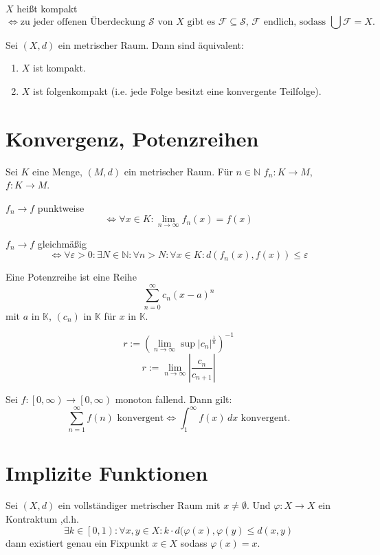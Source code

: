 \documentclass[]{scrartcl}
\newcommand{\N}{\ensuremath{\mathbb{N}}}
\begin{document}
\begin{definition}[Kompaktheit]
$X$ hei\ss t kompakt
\[\Leftrightarrow\text{zu jeder offenen \"Uberdeckung $\mathcal{S}$ von $X$ gibt es $\mathcal{F}\subseteq\mathcal{S}$, $\mathcal{F}$ endlich, sodass $\bigcup\mathcal{F}=X$.}\]
\end{definition}

\begin{satz}
Sei $(X,d)$ ein metrischer Raum. Dann sind \"aquivalent:
\begin{enumerate}
\item $X$ ist kompakt.
\item $X$ ist folgenkompakt (i.e. jede Folge besitzt eine konvergente Teilfolge). 
\end{enumerate}
\end{satz}

\section*{Konvergenz, Potenzreihen}
\begin{definition}[konvergenz]
Sei $K$ eine Menge, $(M,d)$ ein metrischer Raum. F\"ur $n\in\N$ $f_n\colon K\to M$, $f\colon K\to M$.

$f_n\to f$ punktweise
\[\Leftrightarrow \forall x\in K \colon  \lim\limits_{n\to\infty}f_n(x)=f(x)\]

$f_n\to f$ gleichm\"a\ss ig
\[\Leftrightarrow \forall \varepsilon>0 \colon  \exists N\in\N\colon \forall n>N \colon  \forall x\in K\colon  d(f_n(x),f(x))\leq\varepsilon\]
\end{definition}

\begin{definition}[Potenzreihe]
Eine Potenzreihe ist eine Reihe
\[\sum\limits^\infty_{n=0}c_n(x-a)^n\]
mit $a$ in $\mathbb{K}$, $(c_n)$ in $\mathbb{K}$ f\"ur $x$ in $\mathbb{K}$.
\end{definition}

\begin{satz}[Konvergenzradius]
\[r:=(\lim_{n\to\infty}\sup{|c_n|^{\frac{1}{n}}})^{-1}\]
\[r:=\lim_{n\to\infty}\left|\frac{c_n}{c_{n+1}}\right|\]
\end{satz}

\begin{satz}[Integralvergleichskriterium]
Sei $f\colon \left[0,\infty\right)\to \left[0,\infty\right)$ monoton fallend. Dann gilt:
\[\sum\limits^\infty_{n=1}f(n) \text{ konvergent}\Leftrightarrow \int_{1}^{\infty}f(x)\, dx\text{ konvergent.}\]
\end{satz}

\section*{Implizite Funktionen}

\begin{satz}
Sei $(X,d)$ ein vollst\"andiger metrischer Raum mit $x\neq\emptyset$. Und $\varphi\colon X\to X$ ein Kontraktum ,d.h. \[\exists k\in\left[0,1\right)\colon\forall x,y\in X\colon k\cdot d(\varphi(x),\varphi(y)\leq d(x,y)\]
dann existiert genau ein Fixpunkt $x\in X$ sodass $\varphi(x)=x$.
\end{satz}
\end{document}
